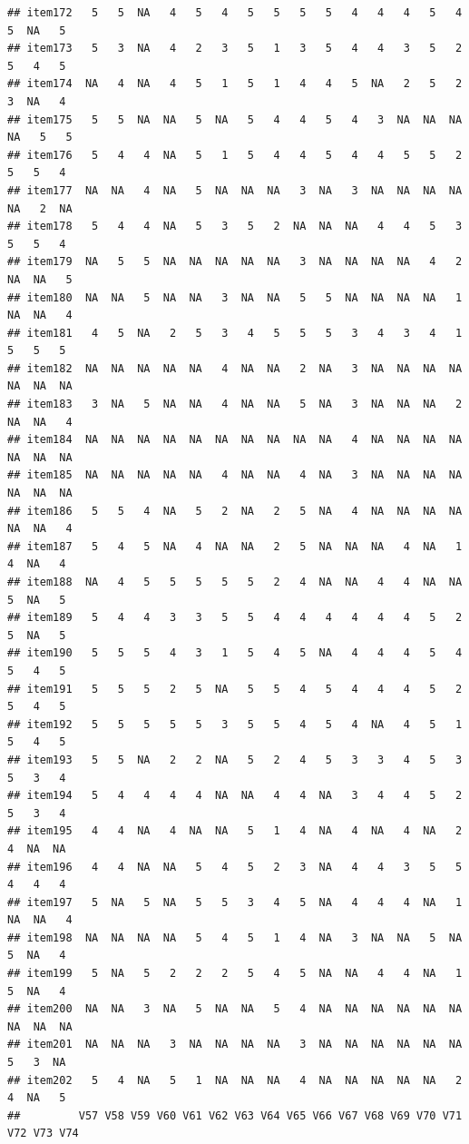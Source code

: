 \documentclass[
  man]{apa6}
\begin{document}
\begin{verbatim}
## item172   5   5  NA   4   5   4   5   5   5   5   4   4   4   5   4   5  NA   5
## item173   5   3  NA   4   2   3   5   1   3   5   4   4   3   5   2   5   4   5
## item174  NA   4  NA   4   5   1   5   1   4   4   5  NA   2   5   2   3  NA   4
## item175   5   5  NA  NA   5  NA   5   4   4   5   4   3  NA  NA  NA  NA   5   5
## item176   5   4   4  NA   5   1   5   4   4   5   4   4   5   5   2   5   5   4
## item177  NA  NA   4  NA   5  NA  NA  NA   3  NA   3  NA  NA  NA  NA  NA   2  NA
## item178   5   4   4  NA   5   3   5   2  NA  NA  NA   4   4   5   3   5   5   4
## item179  NA   5   5  NA  NA  NA  NA  NA   3  NA  NA  NA  NA   4   2  NA  NA   5
## item180  NA  NA   5  NA  NA   3  NA  NA   5   5  NA  NA  NA  NA   1  NA  NA   4
## item181   4   5  NA   2   5   3   4   5   5   5   3   4   3   4   1   5   5   5
## item182  NA  NA  NA  NA  NA   4  NA  NA   2  NA   3  NA  NA  NA  NA  NA  NA  NA
## item183   3  NA   5  NA  NA   4  NA  NA   5  NA   3  NA  NA  NA   2  NA  NA   4
## item184  NA  NA  NA  NA  NA  NA  NA  NA  NA  NA   4  NA  NA  NA  NA  NA  NA  NA
## item185  NA  NA  NA  NA  NA   4  NA  NA   4  NA   3  NA  NA  NA  NA  NA  NA  NA
## item186   5   5   4  NA   5   2  NA   2   5  NA   4  NA  NA  NA  NA  NA  NA   4
## item187   5   4   5  NA   4  NA  NA   2   5  NA  NA  NA   4  NA   1   4  NA   4
## item188  NA   4   5   5   5   5   5   2   4  NA  NA   4   4  NA  NA   5  NA   5
## item189   5   4   4   3   3   5   5   4   4   4   4   4   4   5   2   5  NA   5
## item190   5   5   5   4   3   1   5   4   5  NA   4   4   4   5   4   5   4   5
## item191   5   5   5   2   5  NA   5   5   4   5   4   4   4   5   2   5   4   5
## item192   5   5   5   5   5   3   5   5   4   5   4  NA   4   5   1   5   4   5
## item193   5   5  NA   2   2  NA   5   2   4   5   3   3   4   5   3   5   3   4
## item194   5   4   4   4   4  NA  NA   4   4  NA   3   4   4   5   2   5   3   4
## item195   4   4  NA   4  NA  NA   5   1   4  NA   4  NA   4  NA   2   4  NA  NA
## item196   4   4  NA  NA   5   4   5   2   3  NA   4   4   3   5   5   4   4   4
## item197   5  NA   5  NA   5   5   3   4   5  NA   4   4   4  NA   1  NA  NA   4
## item198  NA  NA  NA  NA   5   4   5   1   4  NA   3  NA  NA   5  NA   5  NA   4
## item199   5  NA   5   2   2   2   5   4   5  NA  NA   4   4  NA   1   5  NA   4
## item200  NA  NA   3  NA   5  NA  NA   5   4  NA  NA  NA  NA  NA  NA  NA  NA  NA
## item201  NA  NA  NA   3  NA  NA  NA  NA   3  NA  NA  NA  NA  NA  NA   5   3  NA
## item202   5   4  NA   5   1  NA  NA  NA   4  NA  NA  NA  NA  NA   2   4  NA   5
##         V57 V58 V59 V60 V61 V62 V63 V64 V65 V66 V67 V68 V69 V70 V71 V72 V73 V74

\end{verbatim}
\end{document}
